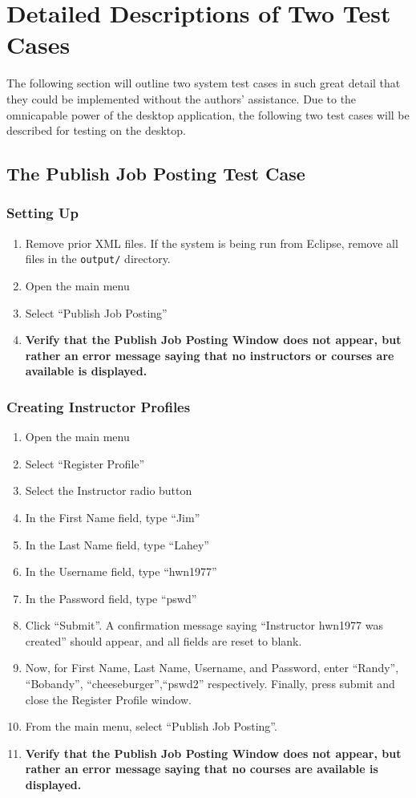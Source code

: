 \documentclass[12pt]{report}
\begin{document}
\section{Detailed Descriptions of Two Test Cases}
The following section will outline two system test cases in such great detail that they could be
implemented without the authors' assistance. Due to the omnicapable power of the desktop
application, the following two test cases will be described for testing on the desktop.
\subsection{The Publish Job Posting Test Case}
\subsubsection{Setting Up}
\begin{enumerate}
	\item Remove prior XML files. If the system is being run from Eclipse, remove all files in the
		\texttt{output/} directory.
	\item Open the main menu
	\item Select ``Publish Job Posting''
	\item \textbf{Verify that the Publish Job Posting Window does not appear, but rather an error
		message saying that no instructors or courses are available is displayed.}
\end{enumerate}
\subsubsection{Creating Instructor Profiles}
\begin{enumerate}
	\item Open the main menu
	\item Select ``Register Profile''
	\item Select the Instructor radio button
	\item In the First Name field, type ``Jim''
	\item In the Last Name field, type ``Lahey''
	\item In the Username field, type ``hwn1977''
	\item In the Password field, type ``pswd''
	\item Click ``Submit''. A confirmation message saying ``Instructor hwn1977 was created'' should
		appear, and all fields are reset to blank.
	\item Now, for First Name, Last Name, Username, and Password, enter ``Randy'', ``Bobandy'',
		``cheeseburger'',``pswd2'' respectively. Finally, press submit and close the Register
		Profile window.
	\item From the main menu, select ``Publish Job Posting''.
	\item \textbf{Verify that the Publish Job Posting Window does not appear, but rather an error
		message saying that no courses are available is displayed.}
\end{enumerate}
\end{document}
